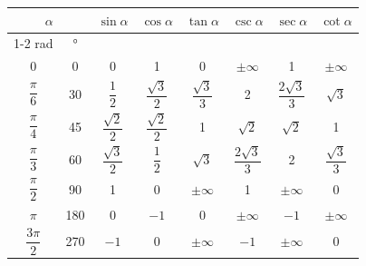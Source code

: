 \begin{center}
    \label{taula:func-trig-angles}
   \begin{tabular}{cccccccc}
   \toprule[1pt]
    \multicolumn{2}{c}{$\alpha$} &
    \multirow{2}{15mm}{\hspace{2ex}\rule{0mm}{6mm}$\sin\alpha$} &
    \multirow{2}{15mm}{\hspace{2ex}\rule{0mm}{6mm}$\cos\alpha$}  &
    \multirow{2}{15mm}{\hspace{2ex}\rule{0mm}{6mm}$\tan\alpha$} &
    \multirow{2}{15mm}{\hspace{2ex}\rule{0mm}{6mm}$\csc\alpha$} &
    \multirow{2}{15mm}{\hspace{2ex}\rule{0mm}{6mm}$\sec\alpha$}  &
    \multirow{2}{15mm}{\hspace{2ex}\rule{0mm}{6mm}$\cot\alpha$}\\
    \cmidrule(rl){1-2}
    rad & \unit{\degree} & & & & & & \\
   \midrule
   0 & 0 & 0 & 1 & 0 & $\pm\infty$ & 1 & $\pm\infty$\\[1ex]
   $\dfrac{\pi}{6}$ & 30 & $\dfrac{1}{2}$ & $\dfrac{\sqrt{3}}{2}$ &
   $\dfrac{\sqrt{3}}{3}$ & 2 & $\dfrac{2\sqrt{3}}{3}$ & $\sqrt{3}$\\[1.5ex]
   $\dfrac{\pi}{4}$ & 45 & $\dfrac{\sqrt{2}}{2}$  &
   $\dfrac{\sqrt{2}}{2}$ & 1 & $\sqrt{2}$ & $\sqrt{2}$ & 1\\[1.5ex]
   $\dfrac{\pi}{3}$ & 60 &  $\dfrac{\sqrt{3}}{2}$ & $\dfrac{1}{2}$ &
   $\sqrt{3}$ & $\dfrac{2\sqrt{3}}{3}$ & 2 & $\dfrac{\sqrt{3}}{3}$\\[2ex]
   $\dfrac{\pi}{2}$ & 90 & 1 & 0 & $\pm\infty$ & 1 & $\pm\infty$ & 0\\[1.5ex]
   $\pi$ & 180 & 0 & $-1$ & 0 & $\pm\infty$ & $-1$ & $\pm\infty$\\[1ex]
   $\dfrac{3\pi}{2}$ & 270 & $-1$ & 0 & $\pm\infty$ & $-1$ & $\pm\infty$ & 0\\
   \bottomrule[1pt]
   \end{tabular}
\end{center}

